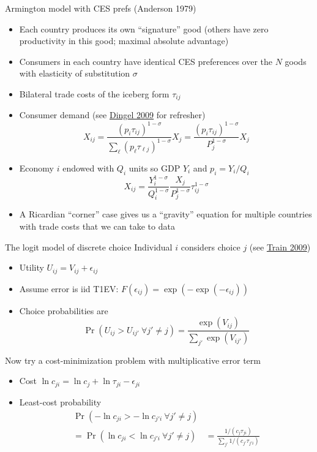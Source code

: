 \documentclass[10pt,notes=hide]{beamer}
\begin{document}
\begin{frame}{Armington model with CES prefs (Anderson 1979)}
\begin{itemize}
	\item Each country produces its own ``signature'' good (others have zero productivity in this good; maximal absolute advantage)
	\item Consumers in each country have identical CES preferences over the $N$ goods with elasticity of substitution $\sigma$
	\item Bilateral trade costs of the iceberg form $\tau_{ij}$
	\item Consumer demand (see \href{http://www.columbia.edu/~jid2106/td/dixitstiglitzbasics.pdf}{Dingel 2009} for refresher)
	\begin{equation*}
	X_{ij}	= \frac{(p_i\tau_{ij} )^{1-\sigma}}{\sum_{\ell} (p_\ell\tau_{\ell j})^{1-\sigma}} X_j
			= \frac{(p_i\tau_{ij} )^{1-\sigma}}{P_j^{1-\sigma}} X_j
	\end{equation*}
	\item Economy $i$ endowed with $Q_i$ units so GDP $Y_i$ and $p_i=Y_i/Q_i$
	\begin{equation*}
	X_{ij}	= \frac{Y_i^{1-\sigma}}{Q_i^{1-\sigma}} \frac{X_j}{P_j^{1-\sigma}}\tau_{ij}^{1-\sigma}
	\end{equation*}
	\item A Ricardian ``corner'' case gives us a ``gravity'' equation for multiple countries with trade costs that we can take to data
\end{itemize}
\end{frame}
\begin{frame}{The logit model of discrete choice}
Individual $i$ considers choice $j$ (see \href{https://eml.berkeley.edu/books/choice2.html}{Train 2009})
\begin{itemize}
	\item Utility $U_{ij} = V_{ij} + \epsilon_{ij}$
	\item Assume error is iid T1EV: $F\left(\epsilon_{ij}\right)=\exp(-\exp(-\epsilon_{ij}))$
	\item Choice probabilities are
	\begin{equation*}\Pr(U_{ij}>U_{ij'} \ \forall j' \neq j) = \frac{\exp(V_{ij})}{\sum_{j'}\exp(V_{ij'})} \end{equation*}
\end{itemize}
Now try a cost-minimization problem with multiplicative error term
\begin{itemize}
	\item Cost $\ln c_{ji} = \ln c_j + \ln \tau_{ji} - \epsilon_{ji}$
	\item Least-cost probability
	\begin{align*}
	\Pr(-\ln c_{ji}> -\ln c_{j'i} \ \forall j' \neq j) \\
	= \Pr(\ln c_{ji}<\ln c_{j'i} \ \forall j' \neq j) 
	& 
	= \frac{1/(c_j\tau_{ji})}{\sum_{j'}1/(c_{j'}\tau_{j'i})} \\
	\end{align*}
\end{itemize}
\end{frame}
\end{document}
